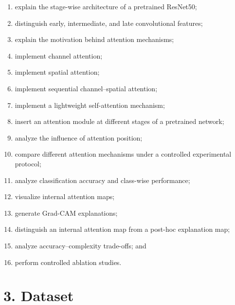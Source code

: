 \documentclass[10pt]{article}
\begin{document}
\begin{enumerate}

\item explain the stage-wise architecture of a pretrained ResNet50;

\item distinguish early, intermediate, and late convolutional features;

\item explain the motivation behind attention mechanisms;

\item implement channel attention;

\item implement spatial attention;

\item implement sequential channel--spatial attention;

\item implement a lightweight self-attention mechanism;

\item insert an attention module at different stages of a pretrained network;

\item analyze the influence of attention position;

\item compare different attention mechanisms under a controlled experimental
protocol;

\item analyze classification accuracy and class-wise performance;

\item visualize internal attention maps;

\item generate Grad-CAM explanations;

\item distinguish an internal attention map from a post-hoc explanation map;

\item analyze accuracy--complexity trade-offs; and

\item perform controlled ablation studies.

\end{enumerate}

\section*{3. Dataset}
\end{document}
